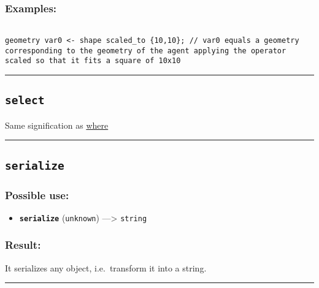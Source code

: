 \documentclass[]{book}
\providecommand{\tightlist}{%
  \setlength{\itemsep}{0pt}\setlength{\parskip}{0pt}}
\theoremstyle{definition}
\theoremstyle{definition}
\theoremstyle{definition}
\theoremstyle{remark}
\begin{document}
\subsubsection{Examples:}\label{examples-310}

\begin{verbatim}
 
geometry var0 <- shape scaled_to {10,10}; // var0 equals a geometry corresponding to the geometry of the agent applying the operator scaled so that it fits a square of 10x10
\end{verbatim}

\begin{center}\rule{0.5\linewidth}{\linethickness}\end{center}

\subsection{\texorpdfstring{\texttt{select}}{select}}\label{select}

Same signification as \href{OperatorsSZ\#where}{where}

\begin{center}\rule{0.5\linewidth}{\linethickness}\end{center}

\subsection{\texorpdfstring{\texttt{serialize}}{serialize}}\label{serialize}

\subsubsection{Possible use:}\label{possible-use-452}

\begin{itemize}
\tightlist
\item
  \textbf{\texttt{serialize}} (\texttt{unknown}) ---\textgreater{}
  \texttt{string}
\end{itemize}

\subsubsection{Result:}\label{result-437}

It serializes any object, i.e.~transform it into a string.

\begin{center}\rule{0.5\linewidth}{\linethickness}\end{center}
\end{document}
